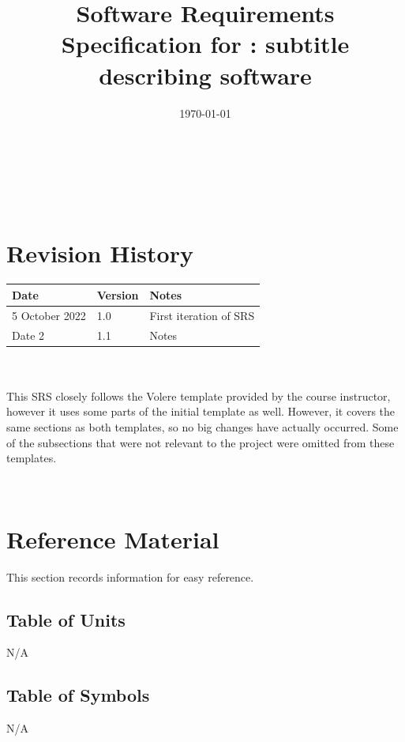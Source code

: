 \documentclass[12pt]{article}
\begin{document}
\title{Software Requirements Specification for \progname: subtitle describing software} 
\author{\authname}
\date{\today}
	
\maketitle

~\newpage


\tableofcontents

~\newpage

\section*{Revision History}

\begin{tabularx}{\textwidth}{p{3cm}p{2cm}X}
\toprule {\bf Date} & {\bf Version} & {\bf Notes}\\
\midrule
5 October 2022 & 1.0 & First iteration of SRS\\
Date 2 & 1.1 & Notes\\
\bottomrule
\end{tabularx}
\\\\
This SRS closely follows the Volere template provided by the course instructor, however it uses some parts of the initial template as well. However, it covers the same sections as both templates, so no big changes have actually occurred. Some of the subsections that were not relevant to the project were omitted from these templates.

~\newpage

\section{Reference Material}

This section records information for easy reference.

\subsection{Table of Units}

N/A

\subsection{Table of Symbols}

N/A
\end{document}
